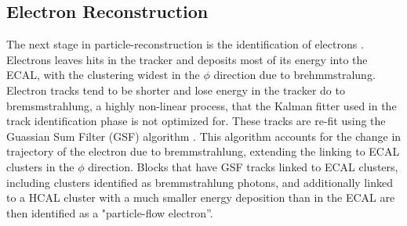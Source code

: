 \subsection{Electron Reconstruction}
\label{electron_reco_overview}

\par The next stage in particle-reconstruction is the identification
of electrons \cite{CMS-PAS-PFT-09-001}.  Electrons leaves hits in the
tracker and deposits most of its energy into the ECAL, with the
clustering widest in the $\phi$ direction due to brehmmstralung.
Electron tracks tend to be shorter and lose energy in the tracker do
to bremsmstrahlung, a highly non-linear process, that the Kalman
fitter used in the track identification phase is not optimized for.
These tracks are re-fit using the Guassian Sum Filter (GSF) algorithm
\cite{Adam:2005bya}. This algorithm accounts for the change in
trajectory of the electron due to bremmstrahlung, extending the
linking to ECAL clusters in the $\phi$ direction.  Blocks that have
GSF tracks linked to ECAL clusters, including clusters identified as
bremmstrahlung photons, and additionally linked to a HCAL cluster with
a much smaller energy deposition than in the ECAL are then identified
as a "particle-flow electron''.  

